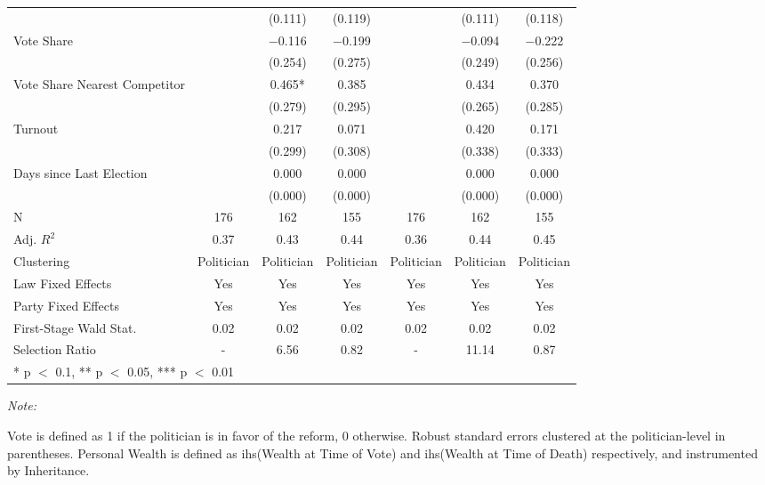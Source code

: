 \begin{table}[!h]
{\begin{threeparttable}
\begin{tabular}[t]{lcccccc}
 &  & (\num{0.111}) & (\num{0.119}) &  & (\num{0.111}) & (\num{0.118})\\
Vote Share &  & \num{-0.116} & \num{-0.199} &  & \num{-0.094} & \num{-0.222}\\
 &  & (\num{0.254}) & (\num{0.275}) &  & (\num{0.249}) & (\num{0.256})\\
Vote Share Nearest Competitor &  & \num{0.465}* & \num{0.385} &  & \num{0.434} & \num{0.370}\\
 &  & (\num{0.279}) & (\num{0.295}) &  & (\num{0.265}) & (\num{0.285})\\
Turnout &  & \num{0.217} & \num{0.071} &  & \num{0.420} & \num{0.171}\\
 &  & (\num{0.299}) & (\num{0.308}) &  & (\num{0.338}) & (\num{0.333})\\
Days since Last Election &  & \num{0.000} & \num{0.000} &  & \num{0.000} & \num{0.000}\\
 &  & (\num{0.000}) & (\num{0.000}) &  & (\num{0.000}) & (\num{0.000})\\
\midrule
N & \num{176} & \num{162} & \num{155} & \num{176} & \num{162} & \num{155}\\
Adj. $R^2$ & \num{0.37} & \num{0.43} & \num{0.44} & \num{0.36} & \num{0.44} & \num{0.45}\\
Clustering & Politician & Politician & Politician & Politician & Politician & Politician\\
Law Fixed Effects & Yes & Yes & Yes & Yes & Yes & Yes\\
Party Fixed Effects & Yes & Yes & Yes & Yes & Yes & Yes\\
First-Stage Wald Stat. & 0.02 & 0.02 & 0.02 & 0.02 & 0.02 & 0.02\\
Selection Ratio & - & 6.56 & 0.82 & - & 11.14 & 0.87\\
\bottomrule
\multicolumn{7}{l}{\rule{0pt}{1em}* p $<$ 0.1, ** p $<$ 0.05, *** p $<$ 0.01}\\
\end{tabular}
\begin{tablenotes}[para]
\item \textit{Note: } 
\item Vote is defined as 1 if the politician is in favor of the reform, 0 otherwise. Robust standard errors clustered at the politician-level in parentheses. Personal Wealth is defined as ihs(Wealth at Time of Vote) and ihs(Wealth at Time of Death) respectively, and instrumented by Inheritance.
\end{tablenotes}
\end{threeparttable}}
\end{table}
